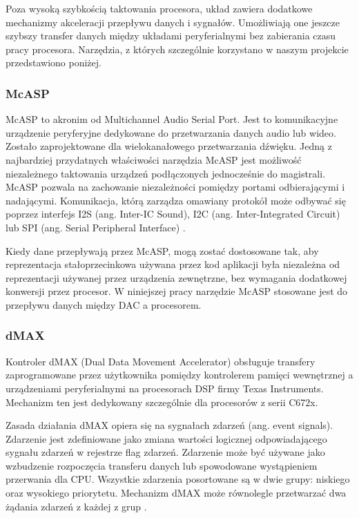 Poza wysoką szybkością taktowania procesora, układ zawiera dodatkowe mechanizmy akceleracji przepływu danych i sygnałów. Umożliwiają one jeszcze szybszy transfer danych między układami peryferialnymi bez zabierania czasu pracy procesora. Narzędzia, z których szczególnie korzystano w naszym projekcie przedstawiono poniżej.

\subsubsection{McASP}
McASP to akronim od Multichannel Audio Serial Port. Jest to komunikacyjne urządzenie peryferyjne dedykowane do przetwarzania danych audio lub wideo. Zostało zaprojektowane dla wielokanałowego przetwarzania dźwięku. Jedną z najbardziej przydatnych właściwości narzędzia McASP jest możliwość niezależnego taktowania urządzeń podłączonych jednocześnie do magistrali. McASP pozwala na zachowanie niezależności pomiędzy portami odbierającymi i nadającymi. Komunikacja, którą zarządza omawiany protokół może odbywać się poprzez interfejs I2S (ang. Inter-IC Sound), I2C (ang. Inter-Integrated Circuit) lub SPI (ang. Serial Peripheral Interface) \cite{dokumentacja_mcasp}.

Kiedy dane przepływają przez McASP, mogą zostać dostosowane tak, aby reprezentacja stałoprzecinkowa używana przez kod aplikacji była niezależna od reprezentacji używanej przez urządzenia zewnętrzne, bez wymagania dodatkowej konwersji przez procesor.
W niniejszej pracy narzędzie McASP stosowane jest do przepływu danych między DAC a procesorem. 

\subsubsection{dMAX} \label{par:dMax}
Kontroler dMAX (Dual Data Movement Accelerator) obsługuje transfery zaprogramowane przez użytkownika pomiędzy kontrolerem pamięci wewnętrznej a urządzeniami peryferialnymi na procesorach DSP firmy Texas Instruments. Mechanizm ten jest dedykowany szczególnie dla procesorów z serii C672x.

Zasada działania dMAX opiera się na sygnałach zdarzeń (ang. event signals). Zdarzenie jest zdefiniowane jako zmiana wartości logicznej odpowiadającego sygnału zdarzeń w rejestrze flag zdarzeń. Zdarzenie może być używane jako wzbudzenie rozpoczęcia transferu danych lub spowodowane wystąpieniem przerwania dla CPU. Wszystkie zdarzenia posortowane są w dwie grupy: niskiego oraz wysokiego priorytetu. Mechanizm dMAX może równolegle przetwarzać dwa żądania zdarzeń z każdej z grup \cite{dokumentacja_dmax}.

